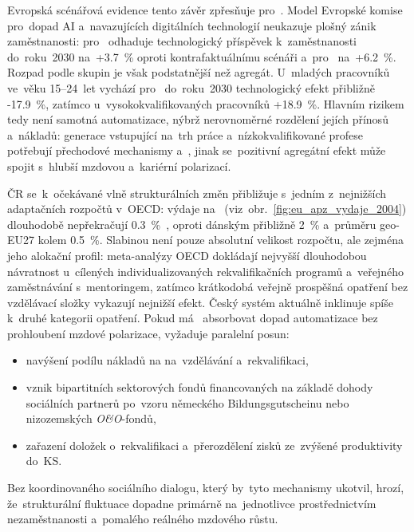 Evropská scénářová evidence tento závěr zpřesňuje pro~. Model Evropské komise pro~dopad \acs{AI} a~navazujících digitálních technologií neukazuje plošný zánik zaměstnanosti: pro~ odhaduje technologický příspěvek k~zaměstnanosti do~roku~2030 na~+\SI{3.7}{\percent} oproti kontrafaktuálnímu scénáři a~pro~ na~+\SI{6.2}{\percent}. Rozpad podle skupin je však podstatnější než agregát. U~mladých pracovníků ve~věku 15--24~let vychází pro~ do~roku~2030 technologický efekt přibližně -\SI{17.9}{\percent}, zatímco u~vysokokvalifikovaných pracovníků +\SI{18.9}{\percent}. Hlavním rizikem tedy není samotná automatizace, nýbrž nerovnoměrné rozdělení jejích přínosů a~nákladů: generace vstupující na~trh práce a~nízkokvalifikované profese potřebují přechodové mechanismy  a~, jinak se~pozitivní agregátní efekt může spojit s~hlubší mzdovou a~kariérní polarizací.~\cite{Petit_AIEmploymentImpact_EU_2026}\par

\Ac{ČR} se~k~očekávané vlně strukturálních změn přibližuje s~jedním
z~nejnižších adaptačních rozpočtů v~\acs{OECD}: výdaje na~
(viz~obr.~\ref{fig:eu_apz_vydaje_2004}) dlouhodobě nepřekračují
\SI{0,3}{\percent}~, oproti dánským přibližně \SI{2}{\percent}
a~průměru \acs{geo-EU27} kolem \SI{0,5}{\percent}.
Slabinou není pouze absolutní velikost rozpočtu, ale zejména jeho alokační
profil: meta-analýzy \acs{OECD} dokládají nejvyšší dlouhodobou návratnost
u~cílených individualizovaných rekvalifikačních programů a~veřejného
zaměstnávání s~mentoringem, zatímco krátkodobá veřejně prospěšná opatření bez
vzdělávací složky vykazují nejnižší efekt.
Český systém aktuálně inklinuje spíše k~druhé kategorii opatření. Pokud má~
absorbovat dopad automatizace bez prohloubení mzdové polarizace,
vyžaduje paralelní posun:
\begin{itemize}[noitemsep, topsep=2pt, leftmargin=*]
	\item navýšení podílu nákladů na  na~vzdělávání a~rekvalifikaci,
	\item vznik bipartitních sektorových fondů financovaných na základě dohody sociálních partnerů
	po~vzoru německého Bildungsgutscheinu nebo nizozemských \emph{O\&O}-fondů,
	\item zařazení doložek o~rekvalifikaci a~přerozdělení zisků ze~zvýšené produktivity do~\acs{KS}.
\end{itemize}
Bez koordinovaného sociálního dialogu, který by~tyto mechanismy ukotvil,
hrozí, že~strukturální fluktuace dopadne primárně na~jednotlivce
prostřednictvím nezaměstnanosti a~pomalého reálného mzdového růstu.~\cite{OECD_GoodJobsForAll_2018}~\cite{NERV_NavrhyRustu2025}~\cite{InovacniDoporuceni_ZahraniceKV}\par

